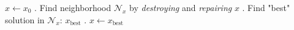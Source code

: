 \documentclass[11pt,letterpaper]{article}
\begin{document}
\begin{algorithmic}
\State $x \gets x_0$
    . Find neighborhood $\mathcal{N}_{x}$ by \emph{destroying} and \emph{repairing} $x$
    . Find "best" solution in $\mathcal{N}_{x}$: $x_{\text{best}}$
    . $x \gets x_{\text{best}}$
\EndWhile
\end{algorithmic}
\end{document}

